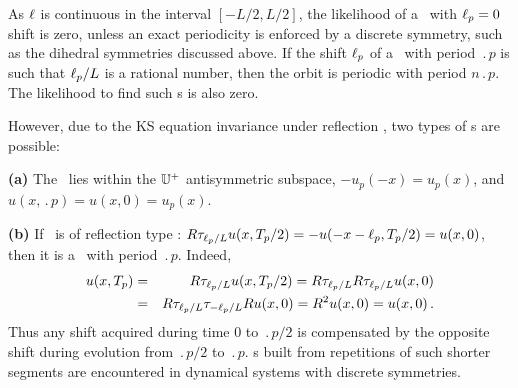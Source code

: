 
As $\ell$ is continuous in the interval $[-L/2, L/2]$,
the likelihood of a \rpo\ with $\ell_p = 0$ shift is zero,
unless an exact periodicity is enforced by a discrete symmetry,
such as the dihedral symmetries discussed above.
If the shift $\ell_p$ of a \rpo\ with period $\period{p}$ is such
that $\ell_p /L$ is a rational number, then the orbit is
periodic with period $n\period{p}$.  The likelihood to find such \po s is
also zero.

However, due to the KS equation invariance under reflection ,
two types of \po s are possible:

{\bf (a)} The \po\ lies within the  $\mathbb{U}^+$ antisymmetric subspace,
$-u_p(-x) = u_p(x)$, and $u(x,\period{p}) = u(x,0) = u_p(x)$.

{\bf (b)} If \rpo\ is of reflection type :
$R\tau_{\ell_p/L} u(x,{T_{p}}/2) = 
-u(-x-\ell_p,{T_{p}}/2) = u(x,0)$, then it is a \po\ with period
$\period{p}$.  Indeed, 
\begin{eqnarray*}
  u(x,{T_{p}}) &=& R\tau_{\ell_p/L} u(x,{T_{p}}/2) = 
  R\tau_{\ell_p/L}R\tau_{\ell_p/L} u(x,0) \\
  &=& R\tau_{\ell_p/L}\tau_{-\ell_p/L}R u(x,0) =
  R^2 u(x,0) = u(x,0)\,.
\end{eqnarray*}
Thus any shift acquired during time $0$ to
$\period{p}/2$ is compensated by the opposite shift during
evolution from $\period{p}/2$ to $\period{p}$.  
\Po s built from repetitions of such shorter segments
are encountered in dynamical systems with discrete
symmetries.

